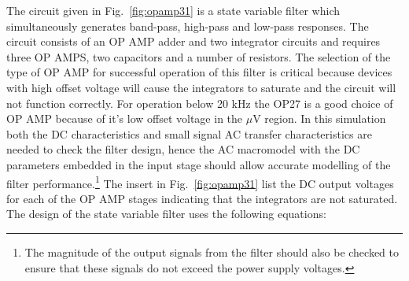 The circuit given in Fig.~\ref{fig:opamp31} is a state variable filter which simultaneously generates band-pass, high-pass and low-pass responses. The circuit consists of an OP AMP adder and two integrator circuits and requires three OP AMPS, two capacitors and a number of resistors.  The selection of the type of OP AMP for successful operation of this filter is critical because devices with high offset voltage will cause the integrators to saturate and the circuit will not function correctly. For operation below 20 kHz the OP27 is a good choice of OP AMP because of it's low offset voltage in the $\mu$V region. In this simulation both the DC characteristics and small signal AC transfer characteristics are needed to check the filter design, hence the AC macromodel with the DC parameters embedded in the input stage should allow accurate modelling of the filter performance.\footnote{The magnitude of the output signals from the filter should also be checked to ensure that these signals do not exceed the power supply voltages.}  The insert in Fig.~\ref{fig:opamp31} list the DC output voltages for each of the OP AMP stages indicating that the integrators are not saturated.  The design of the state variable filter uses the following equations:
